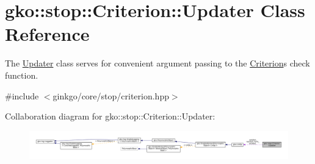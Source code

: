 \hypertarget{classgko_1_1stop_1_1Criterion_1_1Updater}{}\section{gko\+:\+:stop\+:\+:Criterion\+:\+:Updater Class Reference}
\label{classgko_1_1stop_1_1Criterion_1_1Updater}


The \hyperlink{classgko_1_1stop_1_1Criterion_1_1Updater}{Updater} class serves for convenient argument passing to the \hyperlink{classgko_1_1stop_1_1Criterion}{Criterion}\textquotesingle{}s check function.  




{\ttfamily \#include $<$ginkgo/core/stop/criterion.\+hpp$>$}



Collaboration diagram for gko\+:\+:stop\+:\+:Criterion\+:\+:Updater\+:
\nopagebreak
\begin{figure}[H]
\begin{center}
\leavevmode
\includegraphics[width=350pt]{classgko_1_1stop_1_1Criterion_1_1Updater__coll__graph}
\end{center}
\end{figure}
